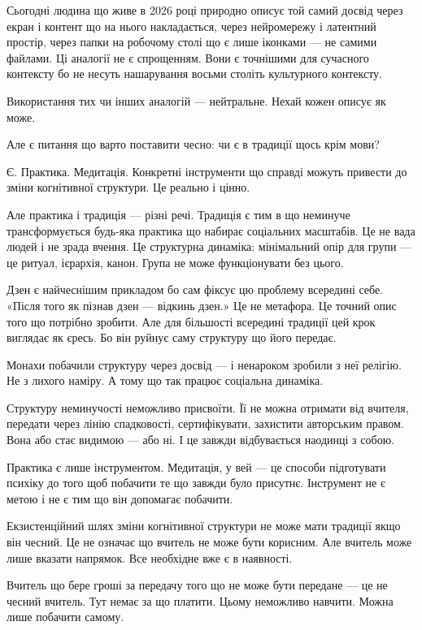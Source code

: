 \documentclass[12pt, a4paper, openany]{book}
\begin{document}
Сьогодні людина що живе в 2026 році природно описує той самий досвід через екран і контент що на нього накладається, через нейромережу і латентний простір, через папки на робочому столі що є лише іконками --- не самими файлами. Ці аналогії не є спрощенням. Вони є точнішими для сучасного контексту бо не несуть нашарування восьми століть культурного контексту.

Використання тих чи інших аналогій --- нейтральне. Нехай кожен описує як може.

Але є питання що варто поставити чесно: чи є в традиції щось крім мови?

Є. Практика. Медитація. Конкретні інструменти що справді можуть привести до зміни когнітивної структури. Це реально і цінно.

Але практика і традиція --- різні речі. Традиція є тим в що неминуче трансформується будь-яка практика що набирає соціальних масштабів. Це не вада людей і не зрада вчення. Це структурна динаміка: мінімальний опір для групи --- це ритуал, ієрархія, канон. Група не може функціонувати без цього.

Дзен є найчеснішим прикладом бо сам фіксує цю проблему всередині себе. «Після того як пізнав дзен --- відкинь дзен.» Це не метафора. Це точний опис того що потрібно зробити. Але для більшості всередині традиції цей крок виглядає як єресь. Бо він руйнує саму структуру що його передає.

Монахи побачили структуру через досвід --- і ненароком зробили з неї релігію. Не з лихого наміру. А тому що так працює соціальна динаміка.

Структуру неминучості неможливо присвоїти. Її не можна отримати від вчителя, передати через лінію спадковості, сертифікувати, захистити авторським правом. Вона або стає видимою --- або ні. І це завжди відбувається наодинці з собою.

Практика є лише інструментом. Медитація, у вей --- це способи підготувати психіку до того щоб побачити те що завжди було присутнє. Інструмент не є метою і не є тим що він допомагає побачити.

Екзистенційний шлях зміни когнітивної структури не може мати традиції якщо він чесний. Це не означає що вчитель не може бути корисним. Але вчитель може лише вказати напрямок. Все необхідне вже є в наявності.

Вчитель що бере гроші за передачу того що не може бути передане --- це не чесний вчитель. Тут немає за що платити. Цьому неможливо навчити. Можна лише побачити самому.
\end{document}
